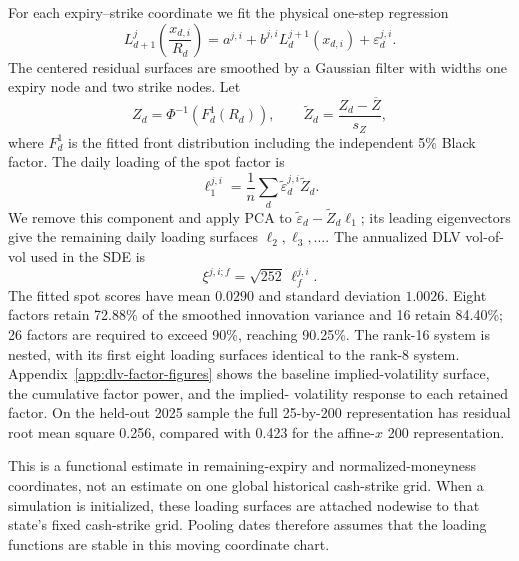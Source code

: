 \documentclass[11pt]{article}
\theoremstyle{plain}
\theoremstyle{definition}
\theoremstyle{remark}
\begin{document}
For each expiry--strike coordinate we fit the physical one-step regression
\begin{equation}
\label{eq:estimation-dlv-ar}
L_{d+1}^{j}\!\left(\frac{x_{d,i}}{R_d}\right)
=a^{j,i}+b^{j,i}L_d^{j+1}(x_{d,i})+\varepsilon_d^{j,i}.
\end{equation}
The centered residual surfaces are smoothed by a Gaussian filter with widths
one expiry node and two strike nodes.  Let
\[
Z_d=\Phi^{-1}\!\left(F_d^1(R_d)\right),
\qquad
\widetilde Z_d=\frac{Z_d-\overline Z}{s_Z},
\]
where $F_d^1$ is the fitted front distribution including the independent 5\%
Black factor.  The daily loading of the spot factor is
\[
\ell_1^{j,i}=\frac1n\sum_d
\widetilde\varepsilon_d^{j,i}\widetilde Z_d.
\]
We remove this component and apply PCA to
$\widetilde\varepsilon_d-\widetilde Z_d\ell_1$; its leading eigenvectors give
the remaining daily loading surfaces $\ell_2,\ell_3,\ldots$.  The annualized
DLV vol-of-vol used in the SDE is
\begin{equation}
\label{eq:estimation-annualized-xi}
\xi^{j,i;f}=\sqrt{252}\,\ell_f^{j,i}.
\end{equation}
The fitted spot scores have mean $0.0290$ and standard deviation $1.0026$.
Eight factors retain 72.88\% of the smoothed innovation variance and 16 retain
84.40\%; 26 factors are required to exceed 90\%, reaching 90.25\%.  The
rank-16 system is nested, with its first eight loading surfaces identical to
the rank-8 system.  Appendix~\ref{app:dlv-factor-figures} shows the baseline
implied-volatility surface, the cumulative factor power, and the implied-
volatility response to each retained factor.  On the held-out 2025 sample the
full 25-by-200 representation has residual root mean square 0.256, compared
with 0.423 for the affine-$x$ 200 representation.

This is a functional estimate in remaining-expiry and normalized-moneyness
coordinates, not an estimate on one global historical cash-strike grid.  When
a simulation is initialized, these loading surfaces are attached nodewise to
that state's fixed cash-strike grid.  Pooling dates therefore assumes that the
loading functions are stable in this moving coordinate chart.
\end{document}
